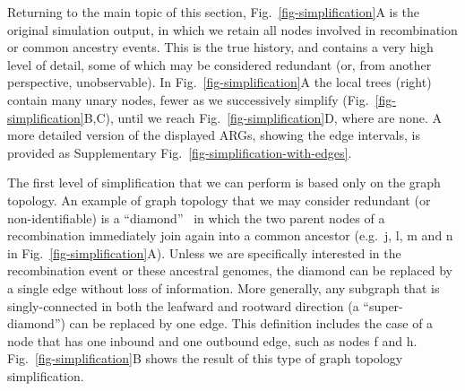 \documentclass{article}
\newcommand{\noderef}[1]{\textsf{#1}}
\begin{document}
Returning to the main topic of this section,
Fig.~\ref{fig-simplification}A is the original simulation output, in
which we retain all nodes involved in recombination
or common ancestry events. This is the true history, and contains
a very high level of detail, some of which may be considered
redundant (or, from another perspective, unobservable).
In Fig.~\ref{fig-simplification}A the local trees (right)
contain many unary nodes, fewer as  we successively
simplify (Fig.~\ref{fig-simplification}B,C),
until we reach Fig.~\ref{fig-simplification}D, where are none.
A more detailed version of the displayed ARGs, showing the edge
intervals, is provided as Supplementary Fig.~\ref{fig-simplification-with-edges}.

The first level of simplification that we can perform is based only
on the graph topology.
An example of graph topology that we may consider redundant
(or non-identifiable) is a
``diamond''~\citep{rasmussen2014genome}
in which the two parent nodes of a recombination immediately
join again into a common ancestor (e.g.~\noderef{j}, \noderef{l}, \noderef{m}
and \noderef{n} in Fig.~\ref{fig-simplification}A).
Unless we are specifically
interested in the recombination event or these ancestral genomes,
the diamond can be replaced by a single edge without loss of
information.
More generally, any subgraph that is singly-connected in both the leafward and
rootward direction (a ``super-diamond'') can be replaced by one edge.
This definition includes the case
of a node that has one inbound and one outbound edge, such as
nodes \noderef{f} and \noderef{h}.
Fig.~\ref{fig-simplification}B shows the result of this type of
graph topology simplification.
\end{document}
